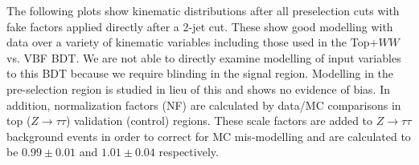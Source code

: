 The following plots show kinematic distributions after all preselection cuts with fake factors applied directly after a 2-jet cut. These show good modelling with data over a variety of kinematic variables including those used in the Top$+WW$ vs. VBF BDT. We are not able to directly examine modelling of input variables to this BDT because we require blinding in the signal region. Modelling in the pre-selection region is studied in lieu of this and shows no evidence of bias. In addition, normalization factors (NF) are calculated by data/MC comparisons in top ($Z\rightarrow\tau\tau$) validation (control) regions. These scale factors are added to $Z\rightarrow\tau\tau$ background events in order to correct for MC mis-modelling and are calculated to be $0.99\pm0.01$ and $1.01\pm0.04$ respectively. 

\begin{figure}[!h]
  \hfill
  \hfill
  \hfill
\end{figure}
